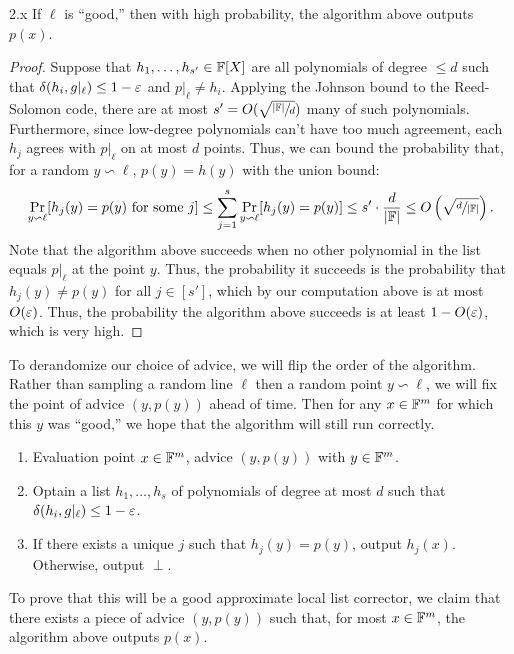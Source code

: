 \documentclass[11pt]{article}
\begin{document}
\begin{claim}{2.x}
    If $\ell$ is ``good,'' then with high probability, the algorithm above outputs $p(x)$.
\end{claim}
\begin{proof}
    Suppose that $h_1, \ldots, h_{s'} \in \mathbb{F}[X]$ are all polynomials of degree $\leq d$ such that $\delta(h_i, g|_\ell) \leq 1 - \varepsilon$ and $p|_\ell \neq h_i$. Applying the Johnson bound to the Reed-Solomon code, there are at most $s' = O(\sqrt{\sfrac{|\mathbb{F}|}{d}})$ many of such polynomials. Furthermore, since low-degree polynomials can't have too much agreement, each $h_j$ agrees with $p|_\ell$ on at most $d$ points. Thus, we can bound the probability that, for a random $y \backsim \ell$, $p(y) = h(y)$ with the union bound:
    \begin{equation*}
        \Pr_{y \backsim \ell}[h_j(y) = p(y) \text{ for some $j$}] \leq \sum_{j = 1}^{s}\Pr_{y \backsim \ell}[h_j(y) = p(y)] \leq s' \cdot \frac{d}{|\mathbb{F}|} \leq O\left(\sqrt{\sfrac{d}{|\mathbb{F}|}}\right).
    \end{equation*}
    Note that the algorithm above succeeds when no other polynomial in the list equals $p|_\ell$ at the point $y$. Thus, the probability it succeeds is the probability that $h_j(y) \neq p(y)$ for all $j \in [s']$, which by our computation above is at most $O(\varepsilon)$. Thus, the probability the algorithm above succeeds is at least $1 - O(\varepsilon)$, which is very high.
\end{proof}
To derandomize our choice of advice, we will flip the order of the algorithm. Rather than sampling a random line $\ell$ then a random point $y \backsim \ell$, we will fix the point of advice $(y, p(y))$ ahead of time. Then for any $x \in \mathbb{F}^m$ for which this $y$ was ``good,'' we hope that the algorithm will still run correctly.
\begin{enumerate}
    \item[Input:] Evaluation point $x \in \mathbb{F}^m$, advice $(y, p(y))$ with $y \in \mathbb{F}^m$.
    \item[$\rightarrow$ 1:] Optain a list $h_1, \ldots, h_s$ of polynomials of degree at most $d$ such that $\delta(h_i, g |_\ell) \leq 1 - \varepsilon$.
    \item[$\rightarrow$ 2:] If there exists a unique $j$ such that $h_j(y) = p(y)$, output $h_j(x)$. Otherwise, output $\perp$.
\end{enumerate}

To prove that this will be a good approximate local list corrector, we claim that there exists a piece of advice $(y, p(y))$ such that, for most $x \in \mathbb{F}^m$, the algorithm above outputs $p(x)$.
\end{document}
